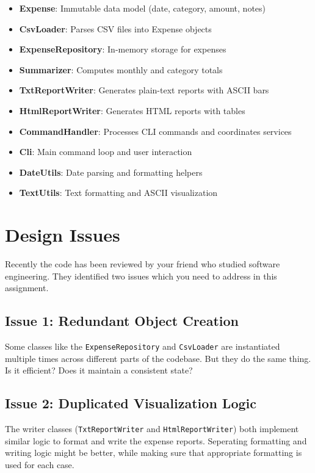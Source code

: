 \documentclass[10pt]{article}
\begin{document}
\begin{itemize}
  \item \textbf{Expense}: Immutable data model (date, category, amount, notes)
  \item \textbf{CsvLoader}: Parses CSV files into Expense objects
  \item \textbf{ExpenseRepository}: In-memory storage for expenses
  \item \textbf{Summarizer}: Computes monthly and category totals
  \item \textbf{TxtReportWriter}: Generates plain-text reports with ASCII bars
  \item \textbf{HtmlReportWriter}: Generates HTML reports with tables
  \item \textbf{CommandHandler}: Processes CLI commands and coordinates services
  \item \textbf{Cli}: Main command loop and user interaction
  \item \textbf{DateUtils}: Date parsing and formatting helpers
  \item \textbf{TextUtils}: Text formatting and ASCII visualization
\end{itemize}

\section{Design Issues}

Recently the code has been reviewed by your friend who studied software engineering.
They identified two issues  which you need to address in this assignment.

\subsection{Issue 1: Redundant Object Creation}

Some classes like the \texttt{ExpenseRepository} and \texttt{CsvLoader} are instantiated multiple times across different parts of the codebase.
But they do the same thing. Is it efficient? Does it maintain a consistent state?

\subsection{Issue 2: Duplicated Visualization Logic}
The writer classes (\texttt{TxtReportWriter} and \texttt{HtmlReportWriter}) both implement
similar logic to format and write the expense reports. Seperating formatting and writing logic might be better,
while making sure that appropriate formatting is used for each case.
\end{document}
